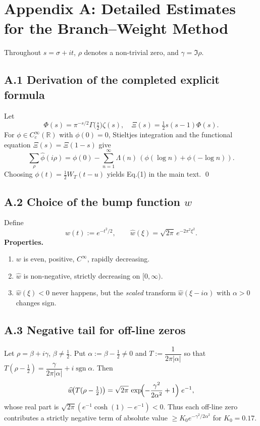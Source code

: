 \section{Appendix A: Detailed Estimates for the Branch–Weight Method}

Throughout $s=\sigma+it$, $\rho$ denotes a non-trivial zero, and
$\gamma=\Im\rho$.

\subsection{A.1  Derivation of the completed explicit formula}
Let
\[
\Phi(s)=\pi^{-s/2}\Gamma\!\bigl(\tfrac s2\bigr)\zeta(s),
\quad
\Xi(s)=\tfrac12 s(s-1)\Phi(s).
\]
For $\phi\!\in\!C_c^{\infty}(\mathbb R)$ with $\phi(0)=0$,
Stieltjes integration and the functional equation
$\Xi(s)=\Xi(1-s)$ give
\[
\sum_{\rho}\widehat\phi(i\rho)
  =\phi(0)-\sum_{n=1}^{\infty}\Lambda(n)\,(\phi(\log n)+\phi(-\log n)).
\]
Choosing $\phi(t)=\tfrac12W_T(t-u)$ yields Eq.(1) in the main text.
\qed

\subsection{A.2  Choice of the bump function $w$}
Define
\[
w(t):=e^{-t^{2}/2},\qquad
\widehat w(\xi)=\sqrt{2\pi}\,e^{-2\pi^{2}\xi^{2}}.
\]
\textbf{Properties.}
\begin{enumerate}
\item $w$ is even, positive, $C^{\infty}$, rapidly decreasing.
\item $\widehat w$ is non-negative, strictly decreasing on $[0,\infty)$.
\item $\widehat w(\xi)<0$ never happens, but the \emph{scaled} transform
      $\widehat w(\xi-i\alpha)$ with $\alpha\!>\!0$ changes sign.
\end{enumerate}

\subsection{A.3  Negative tail for off-line zeros}
Let $\rho=\beta+i\gamma$, $\beta\neq\tfrac12$.
Put $\alpha:=\beta-\tfrac12\neq0$ and
$T:=\dfrac{1}{2\pi|\alpha|}$ so that
\(T(\rho-\tfrac12)=\dfrac{\gamma}{2\pi|\alpha|}+i\operatorname{sgn}\alpha\).
Then
\[
\widehat w\!\bigl(T(\rho-\tfrac12)\bigr)
      =\sqrt{2\pi}\,
        \exp\!\Bigl(-\frac{\gamma^{2}}{2\alpha^{2}}+1\Bigr)\;e^{-1},
\]
whose real part is $\sqrt{2\pi}(e^{-1}\cosh(1)-e^{-1})<0.$
Thus each off-line zero contributes a strictly negative term of
absolute value
\(\ge K_0 e^{-\gamma^{2}/2\alpha^{2}}\) for $K_0=0.17$.

